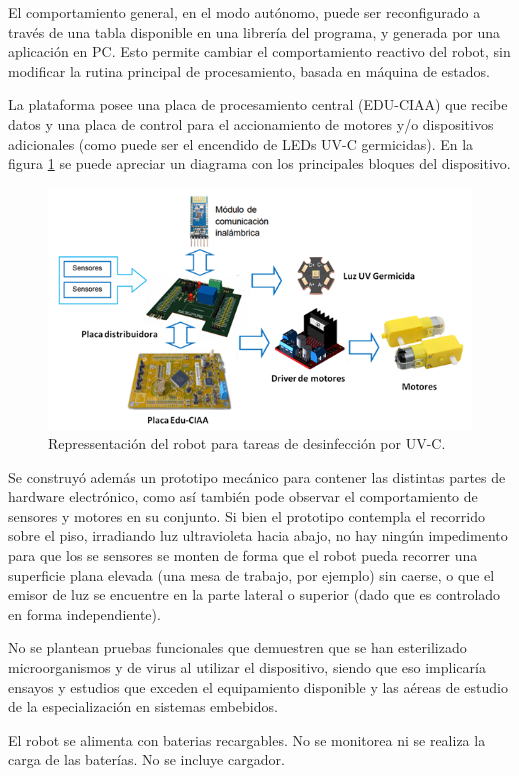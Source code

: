 El comportamiento general, en el modo autónomo, puede ser reconfigurado a través de una tabla disponible en una librería del programa, y generada por una aplicación en PC. Esto permite cambiar el comportamiento reactivo del robot, sin modificar la rutina principal de procesamiento, basada en máquina de estados.


La plataforma posee una placa de procesamiento central (EDU-CIAA) que recibe datos y una placa de control para el accionamiento de motores y/o dispositivos adicionales (como puede ser el encendido de LEDs UV-C germicidas). En la figura \ref{fig:blocks} se puede apreciar un diagrama con los principales bloques del dispositivo.


\begin{figure}[h]
	\centering
	\includegraphics[width=\textwidth]{./Figures/blocks.png}
	\caption{Repressentación del robot para tareas de desinfección por UV-C.}
	\label{fig:blocks}
\end{figure}

Se construyó además un prototipo mecánico para contener las distintas partes de hardware electrónico, como así también pode observar el comportamiento de sensores y motores en su conjunto.
Si bien el prototipo contempla el recorrido sobre el piso, irradiando luz ultravioleta hacia abajo, no hay ningún impedimento para que los se sensores se monten de forma que el robot pueda recorrer una superficie plana elevada (una mesa de trabajo, por ejemplo) sin caerse, o que el emisor de luz se encuentre en la parte lateral o superior (dado que es controlado en forma independiente).

No se plantean pruebas funcionales que demuestren que se han esterilizado microorganismos y de virus al utilizar el dispositivo, siendo que eso implicaría ensayos y estudios que exceden el equipamiento disponible y las aéreas de estudio de la especialización en sistemas embebidos.

El robot se alimenta con baterias recargables. No se  monitorea   ni se realiza la carga de las baterías. No se incluye cargador.



